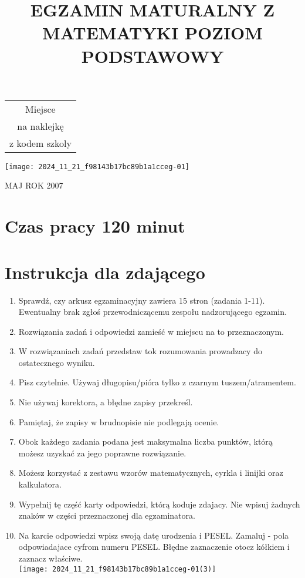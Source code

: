 \documentclass[10pt]{article}
\title{EGZAMIN MATURALNY Z MATEMATYKI POZIOM PODSTAWOWY }
\author{}
\date{}
\begin{document}
\maketitle
\begin{center}
\begin{tabular}{|c|}
\hline
Miejsce \\
na naklejkę \\
z kodem szkoly \\
\hline
\end{tabular}
\end{center}

\begin{center}
\texttt{[image: 2024\_11\_21\_f98143b17bc89b1a1cceg-01]}
\end{center}

MAJ ROK 2007

\section*{Czas pracy 120 minut}
\section*{Instrukcja dla zdającego}
\begin{enumerate}
  \item Sprawdź, czy arkusz egzaminacyjny zawiera 15 stron (zadania 1-11). Ewentualny brak zgłoś przewodniczącemu zespołu nadzorującego egzamin.
  \item Rozwiązania zadań i odpowiedzi zamieść w miejscu na to przeznaczonym.
  \item W rozwiązaniach zadań przedstaw tok rozumowania prowadzacy do ostatecznego wyniku.
  \item Pisz czytelnie. Używaj długopisu/pióra tylko z czarnym tuszem/atramentem.
  \item Nie używaj korektora, a błędne zapisy przekreśl.
  \item Pamiętaj, że zapisy w brudnopisie nie podlegają ocenie.
  \item Obok każdego zadania podana jest maksymalna liczba punktów, którą możesz uzyskać za jego poprawne rozwiązanie.
  \item Możesz korzystać z zestawu wzorów matematycznych, cyrkla i linijki oraz kalkulatora.
  \item Wypełnij tę część karty odpowiedzi, którą koduje zdajacy. Nie wpisuj żadnych znaków w części przeznaczonej dla egzaminatora.
  \item Na karcie odpowiedzi wpisz swoją datę urodzenia i PESEL. Zamaluj - pola odpowiadajace cyfrom numeru PESEL. Błędne zaznaczenie otocz kółkiem i zaznacz właściwe.\\
\texttt{[image: 2024\_11\_21\_f98143b17bc89b1a1cceg-01(3)]}
\end{enumerate}
\end{document}
